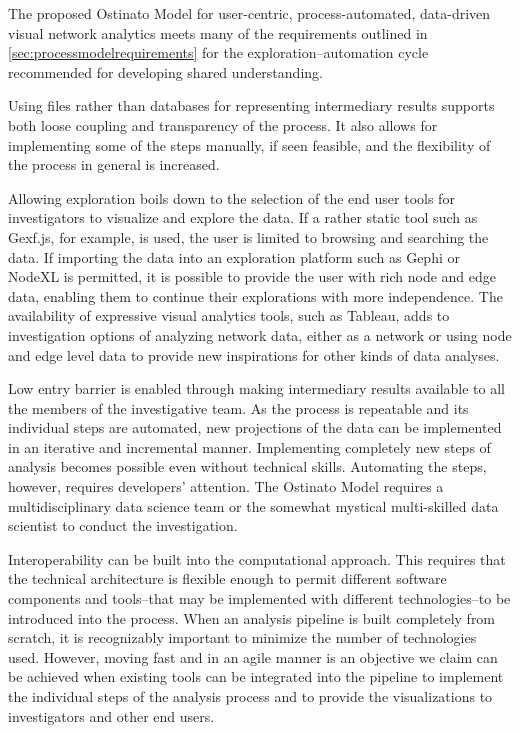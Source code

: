 The proposed Ostinato Model for user-centric, process-automated, data-driven visual network analytics meets many of the requirements outlined in \ref{sec:processmodelrequirements} for the exploration–automation cycle recommended for developing shared understanding.

Using files rather than databases for representing intermediary results supports both loose coupling and transparency of the process. It also allows for implementing some of the steps manually, if seen feasible, and the flexibility of the process in general is increased.

Allowing exploration boils down to the selection of the end user tools for investigators to visualize and explore the data. If a rather static tool such as Gexf.js, for example, is used, the user is limited to browsing and searching the data. If importing the data into an exploration platform such as Gephi or NodeXL is permitted, it is possible to provide the user with rich node and edge data, enabling them to continue their explorations with more independence. The availability of expressive visual analytics tools, such as Tableau, adds to investigation options of analyzing network data, either as a network or using node and edge level data to provide new inspirations for other kinds of data analyses.

Low entry barrier is enabled through making intermediary results available to all the members of the investigative team. As the process is repeatable and its individual steps are automated, new projections of the data can be implemented in an iterative and incremental manner. Implementing completely new steps of analysis becomes possible even without technical skills. Automating the steps, however, requires developers’ attention. The Ostinato Model requires a multidisciplinary data science team or the somewhat mystical multi-skilled data scientist \citep[cf.][]{Davenport2014BigOpportunities} to conduct the investigation.

Interoperability can be built into the computational approach. This requires that the technical architecture is flexible enough to permit different software components and tools--that may be implemented with different technologies--to be introduced into the process. When an analysis pipeline is built completely from scratch, it is recognizably important to minimize the number of technologies used. However, moving fast and in an agile manner is an objective we claim can be achieved when existing tools can be integrated into the pipeline to implement the individual steps of the analysis process and to provide the visualizations to investigators and other end users.

